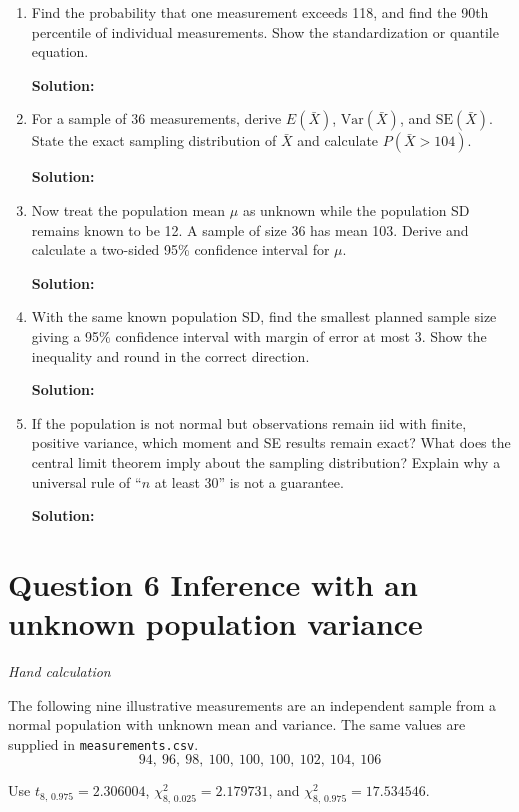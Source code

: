 \documentclass[11pt]{article}
\newcommand{\solution}{\par\medskip\noindent\textbf{Solution:}\par\vspace{0cm}}
\begin{document}
\begin{enumerate}[label=\textbf{(\alph*)}]
  \item Find the probability that one measurement exceeds 118, and find the 90th percentile of individual measurements. Show the standardization or quantile equation.
  \solution

  

  \item For a sample of 36 measurements, derive $E(\bar{X})$, $\text{Var}(\bar{X})$, and $\text{SE}(\bar{X})$. State the exact sampling distribution of $\bar{X}$ and calculate $P(\bar{X} > 104)$.
  \solution

  \item Now treat the population mean $\mu$ as unknown while the population SD remains known to be 12. A sample of size 36 has mean 103. Derive and calculate a two-sided 95\% confidence interval for $\mu$.
  \solution

  \item With the same known population SD, find the smallest planned sample size giving a 95\% confidence interval with margin of error at most 3. Show the inequality and round in the correct direction.
  \solution

  \item If the population is not normal but observations remain iid with finite, positive variance, which moment and SE results remain exact? What does the central limit theorem imply about the sampling distribution? Explain why a universal rule of ``$n$ at least 30'' is not a guarantee.
  \solution
\end{enumerate}

\newpage
\section*{Question 6 \quad Inference with an unknown population variance}
\textit{Hand calculation}

The following nine illustrative measurements are an independent sample from a normal population with unknown mean and variance. The same values are supplied in \texttt{measurements.csv}.
\[
94, \ 96, \ 98, \ 100, \ 100, \ 100, \ 102, \ 104, \ 106
\]

Use $t_{8,\,0.975} = 2.306004$, $\chi^2_{8,\,0.025} = 2.179731$, and $\chi^2_{8,\,0.975} = 17.534546$.
\end{document}
